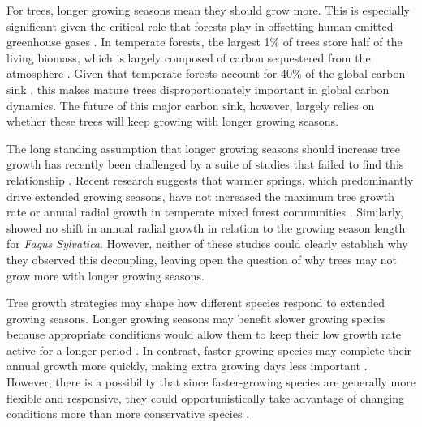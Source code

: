 \documentclass{article}\usepackage[]{graphicx}\usepackage[]{xcolor}
\begin{document}
For trees, longer growing seasons mean they should grow more. This is especially significant given the critical role that forests play in offsetting human-emitted greenhouse gases \citep{keenan_net_2014, stridbeck_partly_2022,harrisGlobalMapsTwentyfirst2021}. In temperate forests, the largest 1\% of trees store half of the living biomass, which is largely composed of carbon sequestered from the atmosphere \citep{lutz_global_2018,mensah_carbon_2024}. Given that temperate forests account for 40\% of the global carbon sink \citep{gibbs_revised_2025}, this makes mature trees disproportionately important in global carbon dynamics. The future of this major carbon sink, however, largely relies on whether these trees will keep growing with longer growing seasons.

The long standing assumption that longer growing seasons should increase tree growth has recently been challenged by a suite of studies that failed to find this relationship \citep{dow_warm_2022,silvestro_longer_2023,cufar_variations_2015,charletdesauvage_temperature_2022,cabon_crossbiome_2022}. Recent research suggests that warmer springs, which predominantly drive extended growing seasons, have not increased the maximum tree growth rate or annual radial growth in temperate mixed forest communities \citep{dow_warm_2022}. Similarly, \cite{cufar_variations_2015} showed no shift in annual radial growth in relation to the growing season length for \textit{Fagus Sylvatica}. However, neither of these studies could clearly establish why they observed this decoupling, leaving open the question of why trees may not grow more with longer growing seasons.  

Tree growth strategies may shape how different species respond to extended growing seasons. Longer growing seasons may benefit slower growing species because appropriate conditions would allow them to keep their low growth rate active for a longer period \citep{cuny_life_2012}. In contrast, faster growing species may complete their annual growth more quickly, making extra growing days less important \citep{cuny_life_2012}. However, there is a possibility that since faster-growing species are generally more flexible and responsive, they could opportunistically take advantage of changing conditions more than more conservative species \citep{baumgarten_indeterminacy_2026}.
\end{document}
